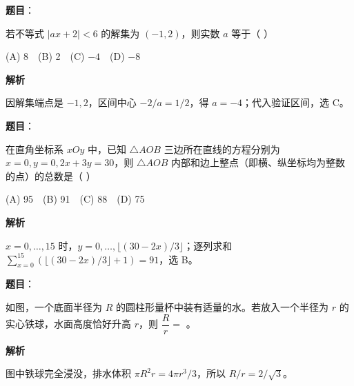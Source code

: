 \begin{answer}

\textbf{题目}：

若不等式 $|ax+2|<6$ 的解集为 $(-1,2)$，则实数 $a$ 等于（ ）

    (A) 8　(B) 2　(C) $-4$　(D) $-8$

\textbf{解析}

因解集端点是 $-1,2$，区间中心 $-2/a=1/2$，得 $a=-4$；代入验证区间，选 C。


\end{answer}
\begin{answer}

\textbf{题目}：

在直角坐标系 $xOy$ 中，已知 $\triangle AOB$ 三边所在直线的方程分别为 $x=0,y=0,2x+3y=30$，则 $\triangle AOB$ 内部和边上整点（即横、纵坐标均为整数的点）的总数是（ ）

    (A) 95　(B) 91　(C) 88　(D) 75

\textbf{解析}

$x=0,\ldots,15$ 时，$y=0,\ldots,\lfloor(30-2x)/3\rfloor$；逐列求和 $\sum_{x=0}^{15}(\lfloor(30-2x)/3\rfloor+1)=91$，选 B。


\end{answer}
\begin{answer}

\textbf{题目}：

如图，一个底面半径为 $R$ 的圆柱形量杯中装有适量的水。若放入一个半径为 $r$ 的实心铁球，水面高度恰好升高 $r$，则 $\dfrac Rr=$ \gkblank{}。
\nopagebreak[4]
\begin{center}\end{center}
\nopagebreak[4]
\textbf{解析}

图中铁球完全浸没，排水体积 $\pi R^2r=4\pi r^3/3$，所以 $R/r=2/\sqrt3$。


\end{answer}
